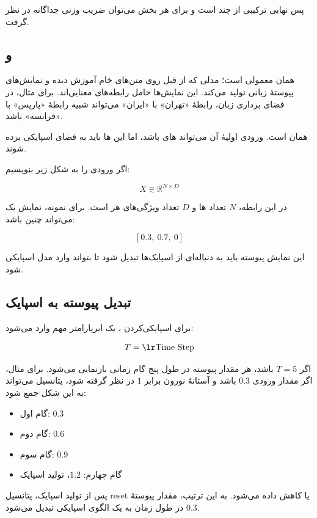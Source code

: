 پس  نهایی ترکیبی از چند  است و برای هر بخش می‌توان ضریب وزنی جداگانه در نظر گرفت.

\subsection{ و }
 همان  معمولی است؛ مدلی که از قبل روی متن‌های خام آموزش دیده و نمایش‌های پیوستهٔ زبانی تولید می‌کند. این نمایش‌ها حامل رابطه‌های معنایی‌اند. برای مثال، در فضای برداری زبان، رابطهٔ «تهران» با «ایران» می‌تواند شبیه رابطهٔ «پاریس» با «فرانسه» باشد.

 همان  است. ورودی اولیهٔ آن می‌تواند های  باشد، اما این ها باید به فضای اسپایکی برده شوند.

اگر ورودی  را به شکل زیر بنویسیم:

\[
X \in \mathbb{R}^{N \times D}
\]

در این رابطه، \(N\) تعداد ها و \(D\) تعداد ویژگی‌های هر  است. برای نمونه، نمایش یک  می‌تواند چنین باشد:

\[
[0.3,\ 0.7,\ 0]
\]

این نمایش پیوسته باید به دنباله‌ای از اسپایک‌ها تبدیل شود تا بتواند وارد مدل اسپایکی شود.

\subsection{تبدیل  پیوسته به اسپایک}
برای اسپایکی‌کردن ، یک ابرپارامتر مهم وارد می‌شود:

\[
T = \text{\eng{Time Step}}
\]

اگر \(T=5\) باشد، هر مقدار پیوسته در طول پنج گام زمانی بازنمایی می‌شود. برای مثال، اگر مقدار ورودی \(0.3\) باشد و آستانهٔ نورون  برابر \(1\) در نظر گرفته شود، پتانسیل می‌تواند به این شکل جمع شود:

\begin{itemize}
  \item گام اول: \(0.3\)
  \item گام دوم: \(0.6\)
  \item گام سوم: \(0.9\)
  \item گام چهارم: \(1.2\)، تولید اسپایک
\end{itemize}

پس از تولید اسپایک، پتانسیل reset یا کاهش داده می‌شود. به این ترتیب، مقدار پیوستهٔ \(0.3\) در طول زمان به یک الگوی اسپایکی تبدیل می‌شود.

